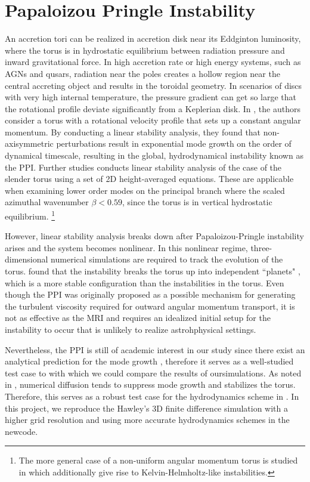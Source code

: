 \documentclass[iop,revtex4]{emulateapj}
\begin{document}
\section{Papaloizou Pringle Instability\label{ppi}}
An accretion tori can be realized in accretion disk near its Eddginton luminosity, where the torus is in hydrostatic equilibrium between radiation pressure and inward gravitational force. In high accretion rate or high energy systems, such as AGNs and qusars, radiation near the poles creates a hollow region near the central accreting object and results in the toroidal geometry. In scenarios of discs with very high internal temperature, the pressure gradient can get so large that the rotational profile deviate significantly from a Keplerian disk.  In \cite{Papaloizou:1984A}, the authors consider a torus with a rotational velocity profile that sets up a constant angular momentum. By conducting a linear stability analysis, they found that non-axisymmetric perturbations result in exponential mode growth on the order of dynamical timescale, resulting in the global, hydrodynamical instability known as the \acf{PPI}. Further studies conducts linear stability analysis of the case of the slender torus using a set of 2D height-averaged equations. These are applicable when examining lower order modes on the principal branch where the scaled azimuthal wavenumber $\beta<0.59$, since the torus is in vertical hydrostatic equilibrium. \footnote{The more general case of a non-uniform angular momentum torus is studied in \cite{Papaloizou:1985B} which additionally give rise to Kelvin-Helmholtz-like instabilities.}
\par However, linear stability analysis breaks down after Papaloizou-Pringle instability arises and the system becomes nonlinear. In this nonlinear regime, three-dimensional numerical simulations are required to track the evolution of the torus. \cite{Hawley:1990A} found that the instability breaks the torus up into independent ``planets" , which is a more stable configuration than the instabilities in the torus. Even though the \ac{PPI} was originally proposed as a possible mechanism for generating the turbulent viscosity required for outward angular momentum transport, it is not as effective as the \ac{MRI} and requires an idealized initial setup for the instability to occur that is unlikely to realize astrohphysical settings. 
\par Nevertheless, the \ac{PPI} is still of academic interest in our study since there exist an analytical prediction for the mode growth \cite{Goldreich:1986A}, therefore it serves as a well-studied test case to with which we could compare the results of our\app simulations. As noted in \cite{Hawley:1991A}, numerical diffusion tends to suppress mode growth and stabilizes the torus. Therefore, this serves as a robust test case for the hydrodynamics scheme in \app. In this project, we reproduce the Hawley's 3D finite difference simulation with a higher grid resolution and using more accurate hydrodynamics schemes in the new\app code.
\end{document}
